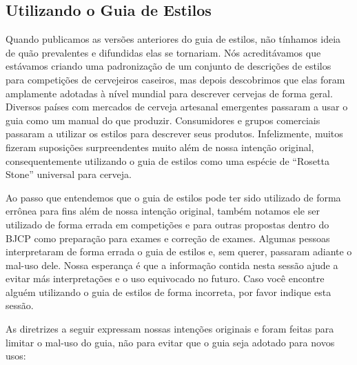 \subsection*{Utilizando o Guia de Estilos}

Quando publicamos as versões anteriores do guia de estilos, não tínhamos ideia de quão prevalentes e difundidas elas se tornariam.  Nós acreditávamos que estávamos criando uma padronização de um conjunto de descrições de estilos para competições de cervejeiros caseiros, mas depois descobrimos que elas foram amplamente adotadas à nível mundial para descrever cervejas de forma geral. Diversos países com mercados de cerveja artesanal emergentes passaram a usar o guia como um manual do que produzir. Consumidores e grupos comerciais passaram a utilizar os estilos para descrever seus produtos. Infelizmente, muitos fizeram suposições surpreendentes muito além de nossa intenção original, consequentemente utilizando o guia de estilos como uma espécie de “Rosetta Stone” universal para cerveja.

Ao passo que entendemos que o guia de estilos pode ter sido utilizado de forma errônea para fins além de nossa intenção original, também notamos ele ser utilizado de forma errada em competições e para outras propostas dentro do BJCP como preparação para exames e correção de exames. Algumas pessoas interpretaram de forma errada o guia de estilos e, sem querer, passaram adiante o mal-uso dele. Nossa esperança é que a informação contida nesta sessão ajude a evitar más interpretações e o uso equivocado no futuro. Caso você encontre alguém utilizando o guia de estilos de forma incorreta, por favor indique esta sessão.

As diretrizes a seguir expressam nossas intenções originais e foram feitas para limitar o mal-uso do guia, não para evitar que o guia seja adotado para novos usos:


